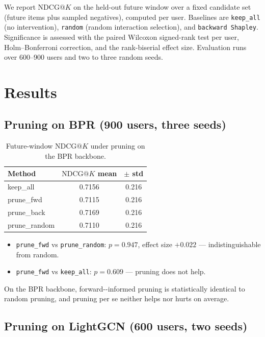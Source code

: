 \documentclass[pdflatex,sn-mathphys-num]{sn-jnl}%
\makeatletter
\theoremstyle{thmstyleone}%
\theoremstyle{thmstyletwo}%
\theoremstyle{thmstylethree}%
\newcommand{\CAV}{\mathrm{CAV}}
\newcommand{\NDCG}{\mathrm{NDCG@}K}
\makeatother
\begin{document}
We report $\NDCG{}$ on the held-out future window over a fixed candidate set (future items plus sampled negatives), computed per user. Baselines are \texttt{keep\_all} (no intervention), \texttt{random} (random interaction selection), and \texttt{backward Shapley}. Significance is assessed with the paired Wilcoxon signed-rank test per user, Holm--Bonferroni correction, and the rank-biserial effect size. Evaluation runs over 600--900 users and two to three random seeds.

\section{Results}\label{sec4}

\subsection{Pruning on BPR (900 users, three seeds)}

\begin{table}[h]
\caption{Future-window $\NDCG{}$ under pruning on the BPR backbone.}
\label{tab:bprprune}
\centering
\begin{tabular}{lcc}
\toprule
Method & $\NDCG{}$ mean & $\pm$ std \\
\midrule
keep\_all   & 0.7156 & 0.216 \\
prune\_fwd  & 0.7115 & 0.216 \\
prune\_back & 0.7169 & 0.216 \\
prune\_random & 0.7110 & 0.216 \\
\bottomrule
\end{tabular}
\end{table}

\begin{itemize}
\item \texttt{prune\_fwd} vs \texttt{prune\_random}: $p=0.947$, effect size $+0.022$ --- indistinguishable from random.
\item \texttt{prune\_fwd} vs \texttt{keep\_all}: $p=0.609$ --- pruning does not help.
\end{itemize}
On the BPR backbone, forward-\CAV{}-informed pruning is statistically identical to random pruning, and pruning per se neither helps nor hurts on average.

\subsection{Pruning on LightGCN (600 users, two seeds)}
\end{document}
